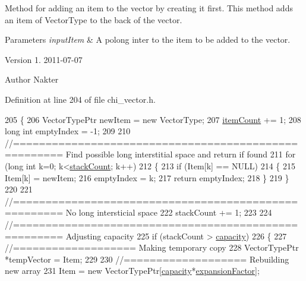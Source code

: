 Method for adding an item to the vector by creating it first. This method adds an item of Vector\+Type to the back of the vector.


\begin{DoxyParams}{Parameters}
{\em input\+Item} & A polong inter to the item to be added to the vector.\\
\hline
\end{DoxyParams}
\begin{DoxyVersion}{Version}
1. 2011-\/07-\/07 
\end{DoxyVersion}
\begin{DoxyAuthor}{Author}
Nakter 
\end{DoxyAuthor}


Definition at line 204 of file chi\+\_\+vector.\+h.


\begin{DoxyCode}
205 \{
206     VectorTypePtr newItem = \textcolor{keyword}{new} VectorType;
207     \hyperlink{class_c_h_i___v_e_c_t_o_r_a0d37a8a4650059da0888be2d9c38487a}{itemCount} += 1;
208     \textcolor{keywordtype}{long} \textcolor{keywordtype}{int} emptyIndex = -1;
209 
210     \textcolor{comment}{//===================================================== Find possible long interstitial space and
       return if found}
211     \textcolor{keywordflow}{for} (\textcolor{keywordtype}{long} \textcolor{keywordtype}{int} k=0; k<\hyperlink{class_c_h_i___v_e_c_t_o_r_a91ef30712b0ead293dfe1adc29fee555}{stackCount}; k++)
212     \{
213         \textcolor{keywordflow}{if} (Item[k] == NULL)
214         \{
215             Item[k]     = newItem;
216             emptyIndex  = k;
217             \textcolor{keywordflow}{return} emptyIndex;
218         \}
219     \}
220 
221     \textcolor{comment}{//===================================================== No long intersticial space}
222     stackCount += 1;
223 
224     \textcolor{comment}{//===================================================== Adjusting capacity}
225     \textcolor{keywordflow}{if} (stackCount > \hyperlink{class_c_h_i___v_e_c_t_o_r_ae73d9f91b472ae07bc32236605934ddb}{capacity})
226     \{
227         \textcolor{comment}{//=================== Making temporary copy}
228         VectorTypePtr *tempVector = Item;
229 
230         \textcolor{comment}{//=================== Rebuilding new array}
231         Item = \textcolor{keyword}{new} VectorTypePtr[\hyperlink{class_c_h_i___v_e_c_t_o_r_ae73d9f91b472ae07bc32236605934ddb}{capacity}*\hyperlink{class_c_h_i___v_e_c_t_o_r_a587c8d362d5149da97ec6519430c4747}{expansionFactor}];                                      \textcolor{comment}{
}
\end{DoxyCode}
